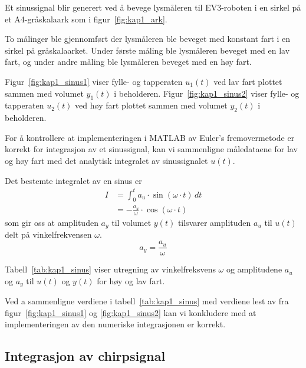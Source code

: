 \documentclass[main.tex]{subfiles}
\begin{document}
Et sinussignal blir generert ved å bevege lysmåleren til \textsc{EV3}-roboten i en sirkel på et A4-gråskalaark som i figur~\ref{fig:kap1_ark}.



To målinger ble gjennomført der lysmåleren ble beveget med konstant fart i en sirkel på gråskalaarket. Under første måling ble lysmåleren beveget med en lav fart, og under andre måling ble lysmåleren beveget med en høy fart.

Figur~\ref{fig:kap1_sinus1} viser fylle- og tapperaten $u_1(t)$ ved lav fart plottet sammen med volumet $y_1(t)$ i beholderen. Figur~\ref{fig:kap1_sinus2} viser fylle- og tapperaten $u_2(t)$ ved høy fart plottet sammen med volumet $y_2(t)$ i beholderen.





For å kontrollere at implementeringen i \textsc{MATLAB} av Euler's fremovermetode er korrekt for integrasjon av et sinussignal, kan vi sammenligne måledataene for lav og høy fart med det analytisk integralet av sinussignalet $u(t)$.

Det bestemte integralet av en sinus er
\begin{align}
    I & = \int_{0}^{t} a_u \cdot \sin{(\omega \cdot t)} \, dt \nonumber \\
      & = -\frac{a_u}{\omega} \cdot \cos{(\omega \cdot t)}
\end{align}
som gir oss at amplituden $a_y$ til volumet $y(t)$ tilsvarer amplituden $a_u$ til $u(t)$ delt på vinkelfrekvensen $\omega$.
\begin{equation}
    a_y = \frac{a_u}{\omega} \label{eq:kap1_amplitude}
\end{equation}

Tabell~\ref{tab:kap1_sinus} viser utregning av vinkelfreksvens $\omega$ og amplitudene $a_u$ og $a_y$ til $u(t)$ og $y(t)$ for høy og lav fart.



Ved a sammenligne verdiene i tabell~\ref{tab:kap1_sinus} med verdiene lest av fra figur~\ref{fig:kap1_sinus1} og \ref{fig:kap1_sinus2} kan vi konkludere med at implementeringen av den numeriske integrasjonen er korrekt.

\subsection{Integrasjon av chirpsignal}
\end{document}
